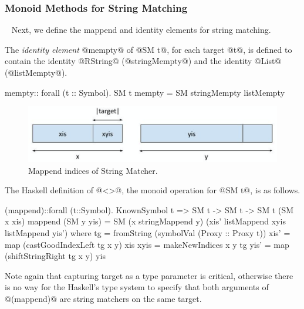 \subsubsection{Monoid Methods for String Matching}~\label{subsec:monoid:methods}
Next, we define the mappend and identity elements for string matching.

The \textit{identity element} @mempty@ of @SM t@, for each target @t@, is
defined to contain the identity @RString@ (@stringMempty@) and the
identity @List@ (@listMempty@).
\begin{code}
  mempty:: forall (t :: Symbol). SM t
  mempty = SM stringMempty listMempty
\end{code}
%


\begin{figure}[t]
\centering
\captionsetup{justification=centering}
\includegraphics[scale=0.5]{text/stringmatcher/makeIndices}
\caption{Mappend indices of String Matcher.}
\label{fig:mappend:indices}
\end{figure}
%
The Haskell definition of @<>@, the monoid operation for @SM t@, is as follows.
\begin{code}
  (mappend)::forall (t::Symbol). KnownSymbol t => SM t -> SM t -> SM t
  (SM x xis) mappend (SM y yis)
    = SM (x stringMappend y) (xis' listMappend xyis listMappend yis')
    where
      tg   = fromString (symbolVal (Proxy :: Proxy t))
      xis' = map (castGoodIndexLeft tg x y) xis
      xyis = makeNewIndices x y tg
      yis' = map (shiftStringRight tg x y) yis
\end{code}
Note again that capturing target as a type parameter is critical,
otherwise there is no way for the Haskell's type system to specify
that both arguments of @(mappend)@ are string matchers on the same target.

